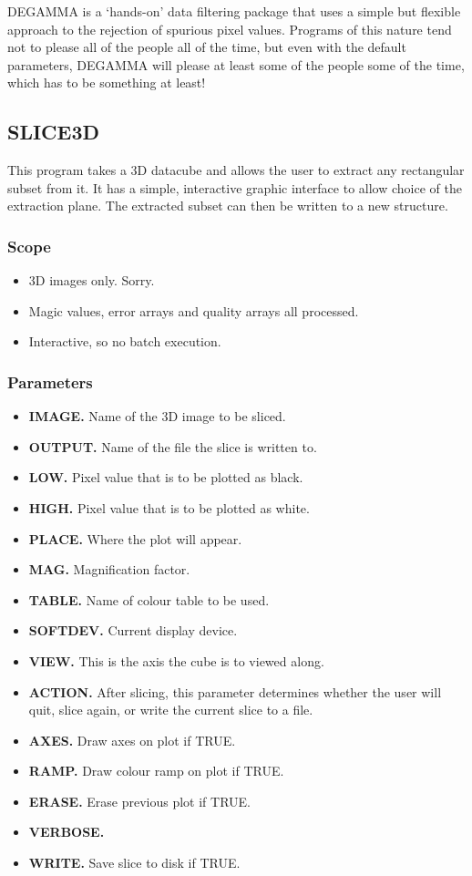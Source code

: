 DEGAMMA is a `hands-on' data filtering package that uses a simple but flexible
approach to the rejection of spurious pixel values. Programs of
this nature tend not to please all of the people all of the time, but even 
with the default parameters, DEGAMMA will please at least some of the people 
some of the time, which has to be something at least! 

\subsection{SLICE3D}

This program takes a 3D datacube and allows the user to extract any rectangular
subset from it. It has a simple, interactive graphic interface to allow choice
of the extraction plane. The extracted subset can then be written to a new
structure.

\subsubsection{Scope}

\begin{itemize}
\item 3D images only. Sorry.
\item Magic values, error arrays and quality arrays all processed.
\item Interactive, so no batch execution.
\end{itemize}


\subsubsection{Parameters}

\begin{itemize}
\item {\bf IMAGE.} Name of the 3D image to be sliced.
\item {\bf OUTPUT.} Name of the file the slice is written to.
\item {\bf LOW.} Pixel value that is to be plotted as black.
\item {\bf HIGH.} Pixel value that is to be plotted as white.
\item {\bf PLACE.} Where the plot will appear.
\item {\bf MAG.} Magnification factor.
\item {\bf TABLE.} Name of colour table to be used.
\item {\bf SOFTDEV.} Current display device.
\item {\bf VIEW.} This is the axis the cube is to viewed along.
\item {\bf ACTION.} After slicing, this parameter determines whether the user
will quit, slice again, or write the current slice to a file.
\item {\bf AXES.} Draw axes on plot if TRUE.
\item {\bf RAMP.} Draw colour ramp on plot if TRUE.
\item {\bf ERASE.} Erase previous plot if TRUE.
\item {\bf VERBOSE.}
\item {\bf WRITE.} Save slice to disk if TRUE.
\end {itemize}

